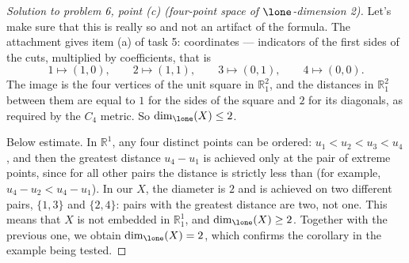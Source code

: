 \documentclass[a4paper,12pt]{report}
\begin{document}
\begin{proof}[Solution to problem \textup{6}, point \textup{(c)} \textup{(}four-point space of $\lone$-dimension \textup{2}\textup{)}]
Let's make sure that this is really so and not an artifact of the formula. The attachment gives item \textup{(a)} of task \textup{5}\textup{:} coordinates --- indicators of the first sides of the cuts, multiplied by coefficients, that is
\[
1\mapsto(1,0),\qquad 2\mapsto(1,1),\qquad 3\mapsto(0,1),\qquad 4\mapsto(0,0).
\]
The image is the four vertices of the unit square in $\mathbb R^2_1$, and the distances in $\mathbb R^2_1$ between them are equal to $1$ for the sides of the square and $2$ for its diagonals, as required by the $C_4$ metric. So $\dim_{\lone}(X)\le2$.

Below estimate. In $\mathbb R^1$, any four distinct points can be ordered\textup{:} $u_1<u_2<u_3<u_4$, and then the greatest distance $u_4-u_1$ is achieved only at the pair of extreme points, since for all other pairs the distance is strictly less than \textup{(}for example, $u_4-u_2<u_4-u_1$\textup{)}. In our $X$, the diameter is $2$ and is achieved on two different pairs, $\{1,3\}$ and $\{2,4\}$\textup{:} pairs with the greatest distance are two, not one. This means that $X$ is not embedded in $\mathbb R^1_1$, and $\dim_{\lone}(X)\ge2$. Together with the previous one, we obtain $\dim_{\lone}(X)=2$, which confirms the corollary in the example being tested.
\end{proof}
\end{document}
